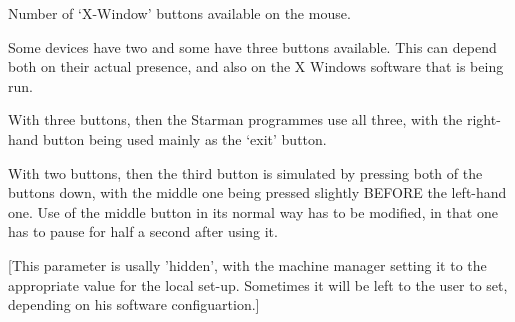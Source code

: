 {{{  Number of `X-Window' buttons available on the mouse.

  Some devices have two and some have three buttons available. This
  can depend both on their actual presence, and also on the X Windows
  software that is being run.

  With three buttons, then the Starman programmes use all three, with
  the right-hand button being used mainly as the `exit' button. 

  With two buttons, then the third button is simulated by pressing 
  both of the buttons down, with the middle one being pressed slightly 
  BEFORE the left-hand one. Use of the middle button in its normal
  way has to be modified, in that one has to pause for half a second
  after using it.

  [This parameter is usally 'hidden', with the machine manager setting
   it to the appropriate value for the local set-up. Sometimes it will 
   be left to the user to set, depending on his software configuartion.]

}}}

